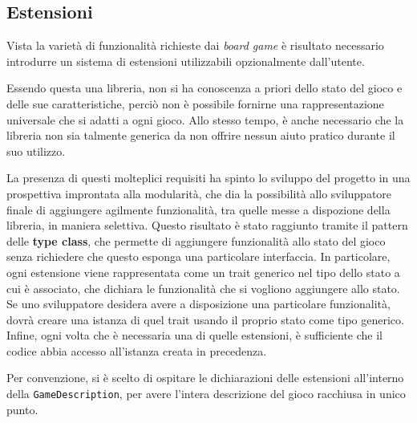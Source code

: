 
\subsection{Estensioni}

Vista la varietà di funzionalità richieste dai \textit{board game} è risultato necessario introdurre un sistema di estensioni utilizzabili opzionalmente dall'utente.

Essendo questa una libreria, non si ha conoscenza a priori dello stato del gioco e delle sue caratteristiche, perciò non è possibile fornirne una rappresentazione universale che si adatti a ogni gioco.
%
Allo stesso tempo, è anche necessario che la libreria non sia talmente generica da non offrire nessun aiuto pratico durante il suo utilizzo.

La presenza di questi molteplici requisiti ha spinto lo sviluppo del progetto in una prospettiva improntata alla modularità, che dia la possibilità allo sviluppatore finale di aggiungere agilmente funzionalità, tra quelle messe a dispozione della libreria, in maniera selettiva.
%
Questo risultato è stato raggiunto tramite il pattern delle \textbf{type class}, che permette di aggiungere funzionalità allo stato del gioco senza richiedere che questo esponga una particolare interfaccia.
%
In particolare, ogni estensione viene rappresentata come un trait generico nel tipo dello stato a cui è associato, che dichiara le funzionalità che si vogliono aggiungere allo stato.
%
Se uno sviluppatore desidera avere a disposizione una particolare funzionalità, dovrà creare una istanza di quel trait usando il proprio stato come tipo generico.
%
Infine, ogni volta che è necessaria una di quelle estensioni, è sufficiente che il codice abbia accesso all'istanza creata in precedenza.

Per convenzione, si è scelto di ospitare le dichiarazioni delle estensioni all'interno della \texttt{GameDescription}, per avere l'intera descrizione del gioco racchiusa in unico punto.

